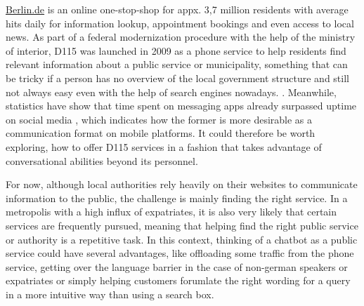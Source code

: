 \href{https://www.berlin.de}{Berlin.de} is an online one-stop-shop for appx. 3,7 million residents \cite{zensus} with  average hits daily for information lookup, appointment bookings and even access to local news. As part of a federal modernization procedure with the help of the ministry of interior, D115 was launched in 2009 \cite{d115} as a phone service to help residents find relevant information about a public service or municipality, something that can be tricky if a person has no overview of the local government structure and still not always easy even with the help of search engines nowadays.
.
Meanwhile, statistics have show that time spent on messaging apps already surpassed uptime on social media \cite{businsider}, which indicates how the former is more desirable as a communication format on mobile platforms. It could therefore be worth exploring, how to offer D115 services in a fashion that takes advantage of conversational abilities beyond its personnel. 

For now, although local authorities rely heavily on their websites to communicate information to the public, the challenge is mainly finding the right service. In a metropolis with a high influx of expatriates, it is also very likely that certain services are frequently pursued, meaning that helping find the right public service or authority is a repetitive task. In this context, thinking of a chatbot as a public service could have several advantages, like offloading some traffic from the phone service, getting over the language barrier in the case of non-german speakers or expatriates or simply helping customers forumlate the right wording for a query in a more intuitive way than using a search box. 









